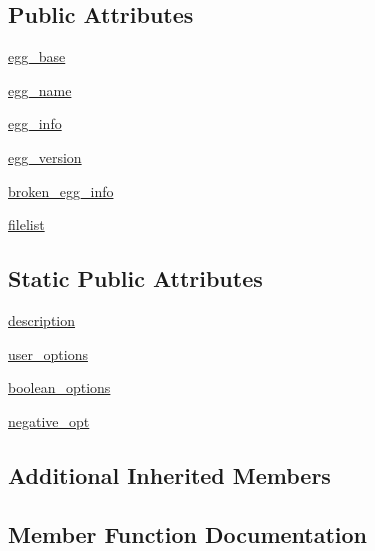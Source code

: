 \subsection*{Public Attributes}
\begin{DoxyCompactItemize}
\item 
\hyperlink{classsetuptools_1_1command_1_1egg__info_1_1egg__info_a749461ae4fdd7081787607b7dd0899cb}{egg\+\_\+base}
\item 
\hyperlink{classsetuptools_1_1command_1_1egg__info_1_1egg__info_a12dbb5447dc9c2bca513d8841a8394ca}{egg\+\_\+name}
\item 
\hyperlink{classsetuptools_1_1command_1_1egg__info_1_1egg__info_ac0d4a2c1b84c0d8d939fe957b7793196}{egg\+\_\+info}
\item 
\hyperlink{classsetuptools_1_1command_1_1egg__info_1_1egg__info_a7567470fab1812a5bd2a31653482d3a1}{egg\+\_\+version}
\item 
\hyperlink{classsetuptools_1_1command_1_1egg__info_1_1egg__info_a2913df2daa81ec130d5ce5267c861245}{broken\+\_\+egg\+\_\+info}
\item 
\hyperlink{classsetuptools_1_1command_1_1egg__info_1_1egg__info_a1e64f1f969ca6d440b9dbf8dd9c2a249}{filelist}
\end{DoxyCompactItemize}
\subsection*{Static Public Attributes}
\begin{DoxyCompactItemize}
\item 
\hyperlink{classsetuptools_1_1command_1_1egg__info_1_1egg__info_aaa5c11ed09519827222c2d0eded44164}{description}
\item 
\hyperlink{classsetuptools_1_1command_1_1egg__info_1_1egg__info_a35f1d83fa356f719459eb8aa79d099a6}{user\+\_\+options}
\item 
\hyperlink{classsetuptools_1_1command_1_1egg__info_1_1egg__info_a8c7d144bd4da0035c6bf2de95eaf7315}{boolean\+\_\+options}
\item 
\hyperlink{classsetuptools_1_1command_1_1egg__info_1_1egg__info_a346fd141193192fac59e5d2d80b7fc33}{negative\+\_\+opt}
\end{DoxyCompactItemize}
\subsection*{Additional Inherited Members}


\subsection{Member Function Documentation}
\mbox{\label{classsetuptools_1_1command_1_1egg__info_1_1egg__info_aa00b1968be994182d4dc99f2a4cfb7fc}} 
